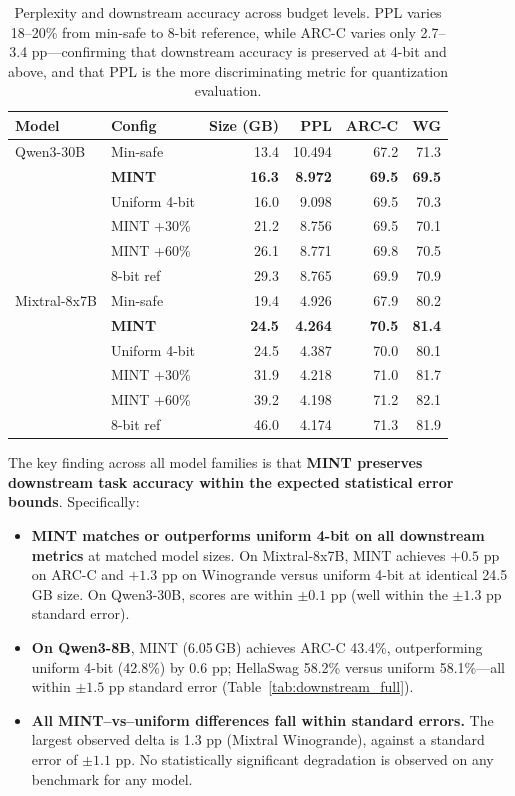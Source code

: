 \documentclass{article}
\begin{document}
\begin{table}[h]
\centering
\caption{Perplexity and downstream accuracy across budget levels. PPL varies 18--20\% from min-safe to 8-bit reference, while ARC-C varies only 2.7--3.4 pp---confirming that downstream accuracy is preserved at 4-bit and above, and that PPL is the more discriminating metric for quantization evaluation.}
\label{tab:benchmarks}
\begin{tabular}{llrrrr}
\toprule
Model & Config & Size (GB) & PPL & ARC-C & WG \\
\midrule
Qwen3-30B & Min-safe & 13.4 & 10.494 & 67.2 & 71.3 \\
 & \textbf{MINT} & \textbf{16.3} & \textbf{8.972} & \textbf{69.5} & \textbf{69.5} \\
 & Uniform 4-bit & 16.0 & 9.098 & 69.5 & 70.3 \\
 & MINT +30\% & 21.2 & 8.756 & 69.5 & 70.1 \\
 & MINT +60\% & 26.1 & 8.771 & 69.8 & 70.5 \\
 & 8-bit ref & 29.3 & 8.765 & 69.9 & 70.9 \\
\midrule
Mixtral-8x7B & Min-safe & 19.4 & 4.926 & 67.9 & 80.2 \\
 & \textbf{MINT} & \textbf{24.5} & \textbf{4.264} & \textbf{70.5} & \textbf{81.4} \\
 & Uniform 4-bit & 24.5 & 4.387 & 70.0 & 80.1 \\
 & MINT +30\% & 31.9 & 4.218 & 71.0 & 81.7 \\
 & MINT +60\% & 39.2 & 4.198 & 71.2 & 82.1 \\
 & 8-bit ref & 46.0 & 4.174 & 71.3 & 81.9 \\
\bottomrule
\end{tabular}
\end{table}

The key finding across all model families is that \textbf{MINT preserves downstream task accuracy within the expected statistical error bounds}. Specifically:

\begin{itemize}
    \item \textbf{MINT matches or outperforms uniform 4-bit on all downstream metrics} at matched model sizes. On Mixtral-8x7B, MINT achieves $+0.5$ pp on ARC-C and $+1.3$ pp on Winogrande versus uniform 4-bit at identical 24.5\,GB size. On Qwen3-30B, scores are within $\pm 0.1$ pp (well within the $\pm 1.3$ pp standard error).

    \item \textbf{On Qwen3-8B}, MINT (6.05\,GB) achieves ARC-C 43.4\%, outperforming uniform 4-bit (42.8\%) by 0.6 pp; HellaSwag 58.2\% versus uniform 58.1\%---all within $\pm 1.5$ pp standard error (Table~\ref{tab:downstream_full}).

    \item \textbf{All MINT--vs--uniform differences fall within standard errors.} The largest observed delta is 1.3 pp (Mixtral Winogrande), against a standard error of $\pm 1.1$ pp. No statistically significant degradation is observed on any benchmark for any model.
\end{itemize}
\end{document}
